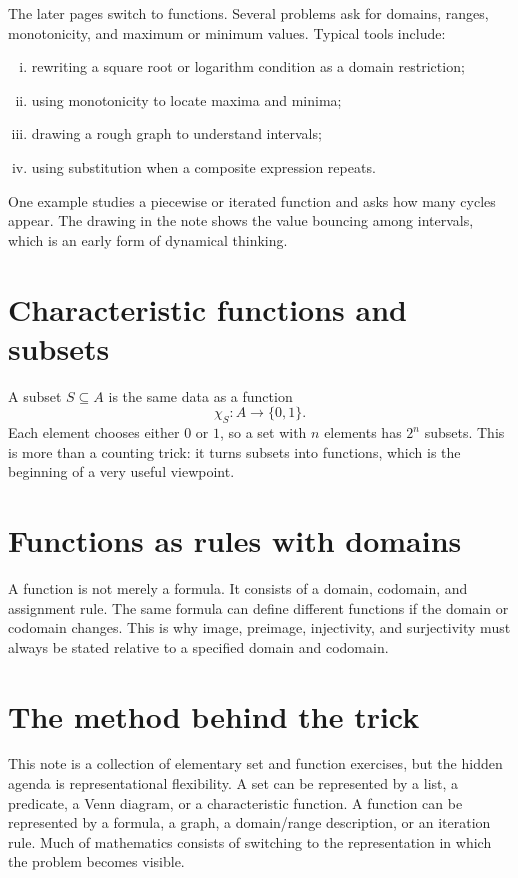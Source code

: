 The later pages switch to functions.  Several problems ask for domains, ranges, monotonicity, and maximum or minimum values.  Typical tools include:
\begin{enumerate}[(i)]
  \item rewriting a square root or logarithm condition as a domain restriction;
  \item using monotonicity to locate maxima and minima;
  \item drawing a rough graph to understand intervals;
  \item using substitution when a composite expression repeats.

\end{enumerate}

One example studies a piecewise or iterated function and asks how many cycles appear.  The drawing in the note shows the value bouncing among intervals, which is an early form of dynamical thinking.


\section{Characteristic functions and subsets}

A subset \(S\subseteq A\) is the same data as a function
\[
  \chi_S:A\to\{0,1\}.
\]
Each element chooses either \(0\) or \(1\), so a set with \(n\) elements has \(2^n\) subsets.  This is more than a counting trick: it turns subsets into functions, which is the beginning of a very useful viewpoint.

\section{Functions as rules with domains}

A function is not merely a formula.  It consists of a domain, codomain, and assignment rule.  The same formula can define different functions if the domain or codomain changes.  This is why image, preimage, injectivity, and surjectivity must always be stated relative to a specified domain and codomain.

\section{The method behind the trick}

This note is a collection of elementary set and function exercises, but the hidden agenda is representational flexibility.  A set can be represented by a list, a predicate, a Venn diagram, or a characteristic function.  A function can be represented by a formula, a graph, a domain/range description, or an iteration rule.  Much of mathematics consists of switching to the representation in which the problem becomes visible.

